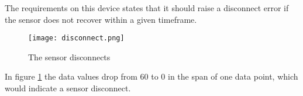 The requirements on this device states that it should raise a disconnect error if the sensor does not recover within a given timeframe.

\begin{figure}[H]
\centering
    \texttt{[image: disconnect.png]}
    \caption{The sensor disconnects}
    \label{fig:disconnect}
\end{figure}

In figure \ref{fig:disconnect} the data values drop from 60 to 0 in the span of one data point, which would indicate a sensor disconnect.
